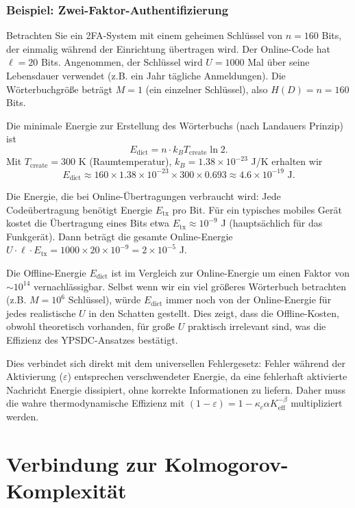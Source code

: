 \documentclass[12pt,a4paper]{article}
\theoremstyle{remark}
\begin{document}
	\subsubsection{Beispiel: Zwei-Faktor-Authentifizierung}
	Betrachten Sie ein 2FA-System mit einem geheimen Schlüssel von $n = 160$ Bits, der einmalig während der Einrichtung übertragen wird. Der Online-Code hat $\ell = 20$ Bits. Angenommen, der Schlüssel wird $U = 1000$ Mal über seine Lebensdauer verwendet (z.B. ein Jahr tägliche Anmeldungen). Die Wörterbuchgröße beträgt $M = 1$ (ein einzelner Schlüssel), also $H(D) = n = 160$ Bits.
	
	Die minimale Energie zur Erstellung des Wörterbuchs (nach Landauers Prinzip) ist
	\[
	E_{\text{dict}} = n \cdot k_B T_{\text{create}} \ln 2.
	\]
	Mit $T_{\text{create}} = 300$ K (Raumtemperatur), $k_B = 1.38 \times 10^{-23}$ J/K erhalten wir
	\[
	E_{\text{dict}} \approx 160 \times 1.38 \times 10^{-23} \times 300 \times 0.693 \approx 4.6 \times 10^{-19} \text{ J}.
	\]
	
	Die Energie, die bei Online-Übertragungen verbraucht wird: Jede Codeübertragung benötigt Energie $E_{\text{tx}}$ pro Bit. Für ein typisches mobiles Gerät kostet die Übertragung eines Bits etwa $E_{\text{tx}} \approx 10^{-9}$ J (hauptsächlich für das Funkgerät). Dann beträgt die gesamte Online-Energie $U \cdot \ell \cdot E_{\text{tx}} = 1000 \times 20 \times 10^{-9} = 2 \times 10^{-5}$ J.
	
	Die Offline-Energie $E_{\text{dict}}$ ist im Vergleich zur Online-Energie um einen Faktor von $\sim 10^{14}$ vernachlässigbar. Selbst wenn wir ein viel größeres Wörterbuch betrachten (z.B. $M = 10^6$ Schlüssel), würde $E_{\text{dict}}$ immer noch von der Online-Energie für jedes realistische $U$ in den Schatten gestellt. Dies zeigt, dass die Offline-Kosten, obwohl theoretisch vorhanden, für große $U$ praktisch irrelevant sind, was die Effizienz des YPSDC-Ansatzes bestätigt.
	
	Dies verbindet sich direkt mit dem universellen Fehlergesetz: Fehler während der Aktivierung ($\varepsilon$) entsprechen verschwendeter Energie, da eine fehlerhaft aktivierte Nachricht Energie dissipiert, ohne korrekte Informationen zu liefern. Daher muss die wahre thermodynamische Effizienz mit $(1-\varepsilon) = 1 - \kappa_c\alpha K_{\mathrm{eff}}^{-\beta}$ multipliziert werden.
	
	\section{Verbindung zur Kolmogorov-Komplexität}
	\label{sec:kolmogorov}
	
\end{document}
